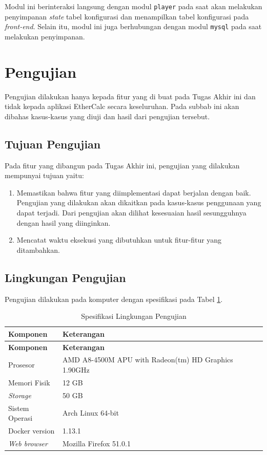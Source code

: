 	Modul ini berinteraksi langsung dengan modul \texttt{player} pada saat akan melakukan penyimpanan \textit{state} tabel konfigurasi dan menampilkan tabel konfigurasi pada \textit{front-end}. Selain itu, modul ini juga berhubungan dengan modul \texttt{mysql} pada saat melakukan penyimpanan.

\section{Pengujian}
Pengujian dilakukan hanya kepada fitur yang di buat pada Tugas Akhir ini dan tidak kepada aplikasi EtherCalc secara keseluruhan. Pada subbab ini akan dibahas kasus-kasus yang diuji dan hasil dari pengujian tersebut.

	\subsection{Tujuan Pengujian}
	Pada fitur yang dibangun pada Tugas Akhir ini, pengujian yang dilakukan mempunyai tujuan yaitu:
	\begin{enumerate}
		\item Memastikan bahwa fitur yang diimplementasi dapat berjalan dengan baik. Pengujian yang dilakukan akan dikaitkan pada kasus-kasus penggunaan yang dapat terjadi. Dari pengujian akan dilihat kesesuaian hasil sesungguhnya dengan hasil yang diinginkan.
		\item Mencatat waktu eksekusi yang dibutuhkan untuk fitur-fitur yang ditambahkan.
	\end{enumerate}

	\subsection{Lingkungan Pengujian}
	Pengujian dilakukan pada komputer dengan spesifikasi pada Tabel \ref{LingPengujian}.

	\begin{small}
	\begin{longtable}{ | p{3cm} | p{9cm} | }
	    \caption{Spesifikasi Lingkungan Pengujian}
	    \label{LingPengujian}\\ \hline
	    \centering\bfseries{Komponen} & \centering\bfseries{Keterangan} \tabularnewline \hline
	    \endfirsthead
	    \hline
	    \centering\bfseries{Komponen} & \centering\bfseries{Keterangan} \tabularnewline \hline
	    \endhead
		Prosesor & AMD A8-4500M APU with Radeon(tm) HD Graphics 1.90GHz\\ \hline
		Memori Fisik & 12 GB\\ \hline
		\textit{Storage} & 50 GB\\ \hline
		Sistem Operasi & Arch Linux 64-bit\\ \hline
		Docker version & 1.13.1\\ \hline
		\textit{Web browser} & Mozilla Firefox 51.0.1\\ \hline
	\end{longtable}
	\end{small}

